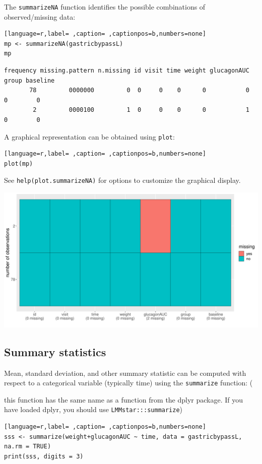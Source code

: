 \documentclass[12pt]{article}
\newcommand\Warning[1][3ex]{%
\renewcommand\stacktype{L}%
\scaleto{\stackon[1.3pt]{\color{red}$\triangle$}{\tiny\bfseries !}}{#1}%
\xspace
}
\begin{document}
The \texttt{summarizeNA} function identifies the possible combinations of
observed/missing data:
\begin{lstlisting}[language=r,label= ,caption= ,captionpos=b,numbers=none]
mp <- summarizeNA(gastricbypassL)
mp
\end{lstlisting}

\begin{verbatim}
frequency missing.pattern n.missing id visit time weight glucagonAUC group baseline
       78         0000000         0  0     0    0      0           0     0        0
        2         0000100         1  0     0    0      0           1     0        0
\end{verbatim}


A graphical representation can be obtained using \texttt{plot}:
\begin{lstlisting}[language=r,label= ,caption= ,captionpos=b,numbers=none]
plot(mp)
\end{lstlisting}

See \texttt{help(plot.summarizeNA)} for options to customize the graphical
display.

\begin{center}
\includegraphics[trim={0 0 0 0},width=1\textwidth]{./figures/summarizeNA.pdf}
\end{center}



\clearpage

\subsection{Summary statistics}
\label{sec:org469785a}

Mean, standard deviation, and other summary statistic can be computed
with respect to a categorical variable (typically time) using the
\texttt{summarize} function: \newline (\Warning this function has the same
name as a function from the dplyr package. If you have loaded dplyr,
you should use \texttt{LMMstar:::summarize})
\begin{lstlisting}[language=r,label= ,caption= ,captionpos=b,numbers=none]
sss <- summarize(weight+glucagonAUC ~ time, data = gastricbypassL, na.rm = TRUE)
print(sss, digits = 3)
\end{lstlisting}
\end{document}
